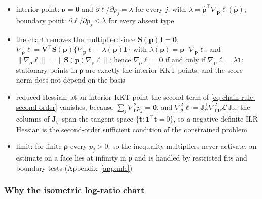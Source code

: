 \begin{itemize}
  \item interior point: \(\boldsymbol{\nu}=\boldsymbol{0}\) and \(\partial\ell/\partial p_{j}=\lambda\) for every \(j\), with
        \(\lambda=\hat{\boldsymbol{p}}^{\top}\nabla_{\boldsymbol{p}}\ell(\hat{\boldsymbol{p}})\); boundary point: \(\partial\ell/\partial p_{j}\le\lambda\)
        for every absent type
  \item the chart removes the multiplier: since \(\boldsymbol{S}(\boldsymbol{p})\mathbf{1}=\boldsymbol{0}\),
        \(\nabla_{\boldsymbol{\rho}}\ell=\mathbf{V}^{\top}\boldsymbol{S}(\boldsymbol{p})\{\nabla_{\boldsymbol{p}}\ell-\lambda(\boldsymbol{p})\mathbf{1}\}\) with
        \(\lambda(\boldsymbol{p})=\boldsymbol{p}^{\top}\nabla_{\boldsymbol{p}}\ell\), and
        \(\lVert\nabla_{\boldsymbol{\rho}}\ell\rVert=\lVert\boldsymbol{S}(\boldsymbol{p})\nabla_{\boldsymbol{p}}\ell\rVert\); hence
        \(\nabla_{\boldsymbol{\rho}}\ell=\boldsymbol{0}\) if and only if \(\nabla_{\boldsymbol{p}}\ell=\lambda\mathbf{1}\): stationary points in
        \(\boldsymbol{\rho}\) are exactly the interior KKT points, and the score norm does not depend on the basis
  \item reduced Hessian: at an interior KKT point the second term of \eqref{eq-chain-rule-second-order} vanishes,
        because \(\sum_{j}\nabla^{2}_{\boldsymbol{\rho}}p_{j}=\boldsymbol{0}\), and
        \(\nabla^{2}_{\boldsymbol{\rho}}\ell=\mathbf{J}_{\psi}^{\top}\nabla^{2}_{\boldsymbol{p}\boldsymbol{p}}\mathcal{L}\,\mathbf{J}_{\psi}\); the columns of
        \(\mathbf{J}_{\psi}\) span the tangent space \(\{\boldsymbol{t}:\mathbf{1}^{\top}\boldsymbol{t}=0\}\), so a negative-definite ILR Hessian is
        the second-order sufficient condition of the constrained problem
  \item limit: for finite \(\boldsymbol{\rho}\) every \(p_{j}>0\), so the inequality multipliers never activate; an
        estimate on a face lies at infinity in \(\boldsymbol{\rho}\) and is handled by restricted fits and boundary
        tests (Appendix~\ref{app:mle})
\end{itemize}

\subsubsection{Why the isometric log-ratio chart}
\label{sec:ilr-choice}

